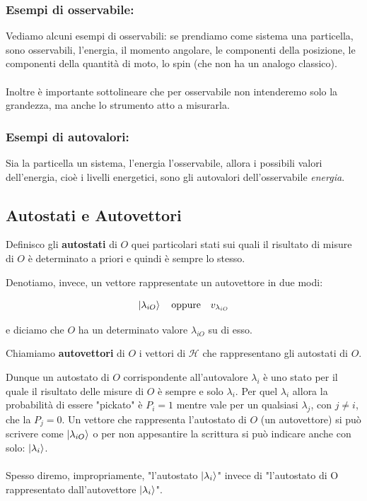 \subsubsection{Esempi di osservabile:}

	Vediamo alcuni esempi di osservabili: se prendiamo come sistema una particella, sono osservabili, l'energia, il momento angolare, le componenti della posizione, le componenti della quantità di moto, lo spin (che non ha un analogo classico).
	\\
	\\
	Inoltre è importante sottolineare che per osservabile non intenderemo solo la grandezza, ma anche lo strumento atto a misurarla.
	
\subsubsection{Esempi di autovalori:}

	Sia la particella un sistema, l'energia l'osservabile, allora i possibili valori dell'energia, cioè i livelli energetici, sono gli autovalori dell'osservabile \textit{energia}.
		
\subsection{Autostati e Autovettori}
	
\begin{mydef}
	Definisco gli \textbf{autostati} di $O$ quei particolari stati sui quali il risultato di misure di $O$ è determinato a priori e quindi è sempre lo stesso. 
\end{mydef} 
	
	Denotiamo, invece, un vettore rappresentate un autovettore in due modi:
	
\begin{align*}
	\ket{\lambda_{iO}} \quad \text{oppure} \quad v_{\lambda_{iO}}
\end{align*}
	
	e diciamo che $O$ ha un determinato valore $\lambda_{iO}$ su di esso.
	
\begin{mydef}
	Chiamiamo \textbf{autovettori} di $O$ i vettori di $\mathcal{H}$ che rappresentano gli autostati di $O$.
\end{mydef}

	Dunque un autostato di $O$ corrispondente all'autovalore $\lambda_i$ è uno stato per il quale il risultato delle misure di $O$ è sempre e solo $\lambda_i$. Per quel $\lambda_i$ allora la probabilità di essere "pickato" è $P_i = 1$ mentre vale per un qualsiasi $\lambda_j$, con $j \neq i$, che la $P_j = 0$. Un vettore che rappresenta l'autostato di $O$ (un autovettore) si può scrivere come $\ket{\lambda_{iO}}$ o per non appesantire la scrittura si può indicare anche con solo: $\ket{\lambda_i}$. 
	\\
	\\
	Spesso diremo, impropriamente,  "l'autostato $\ket{\lambda_i}$" invece di "l'autostato di O rappresentato dall'autovettore $\ket{\lambda_i}$".

